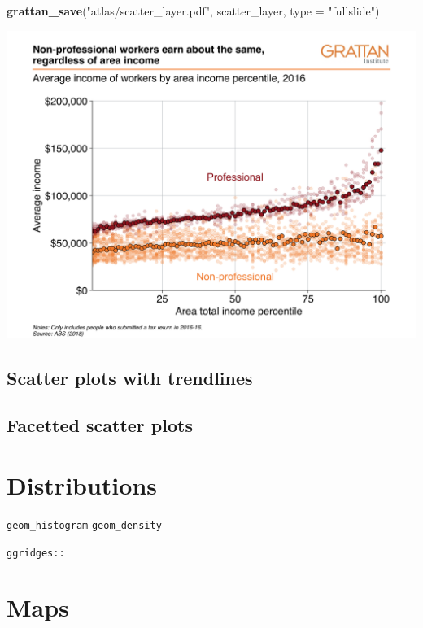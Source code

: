 \documentclass[
]{book}
\newenvironment{Shaded}{\begin{snugshade}}{\end{snugshade}}
\newcommand{\DataTypeTok}[1]{\textcolor[rgb]{0.13,0.29,0.53}{#1}}
\newcommand{\KeywordTok}[1]{\textcolor[rgb]{0.13,0.29,0.53}{\textbf{#1}}}
\newcommand{\NormalTok}[1]{#1}
\newcommand{\StringTok}[1]{\textcolor[rgb]{0.31,0.60,0.02}{#1}}
\begin{document}
\begin{Shaded}
\begin{Highlighting}[]
\KeywordTok{grattan\_save}\NormalTok{(}\StringTok{"atlas/scatter\_layer.pdf"}\NormalTok{, scatter\_layer, }\DataTypeTok{type =} \StringTok{"fullslide"}\NormalTok{)}
\end{Highlighting}
\end{Shaded}

\includegraphics[width=44.44in]{atlas/scatter_layer}

\hypertarget{scatter-plots-with-trendlines}{%
\subsection{Scatter plots with trendlines}\label{scatter-plots-with-trendlines}}

\hypertarget{facetted-scatter-plots}{%
\subsection{Facetted scatter plots}\label{facetted-scatter-plots}}

\hypertarget{distributions}{%
\section{Distributions}\label{distributions}}

\texttt{geom\_histogram}
\texttt{geom\_density}

\texttt{ggridges::}

\hypertarget{maps}{%
\section{Maps}\label{maps}}
\end{document}
